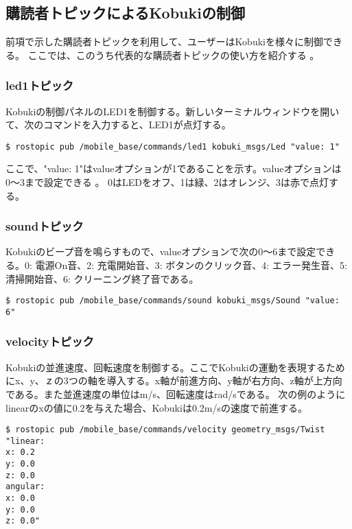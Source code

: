 \begin{itemize}
\subsection{購読者トピックによるKobukiの制御}

前項で示した購読者トピックを利用して、ユーザーはKobukiを様々に制御できる。  ここでは、このうち代表的な購読者トピックの使い方を紹介する  。

\subsubsection{led1トピック}

Kobukiの制御パネルのLED1を制御する。新しいターミナルウィンドウを開いて、次のコマンドを入力すると、LED1が点灯する。

\begin{lstlisting}[language=ROS]
$ rostopic pub /mobile_base/commands/led1 kobuki_msgs/Led "value: 1"
\end{lstlisting}

ここで、"value: 1"はvalueオプションが1であることを示す。valueオプションは0〜3まで設定できる  。 0はLEDをオフ、1は緑、2はオレンジ、3は赤で点灯する。

\subsubsection{soundトピック}

Kobukiのビープ音を鳴らすもので、valueオプションで次の0〜6まで設定できる。0: 電源On音、2: 充電開始音、3: ボタンのクリック音、4: エラー発生音、5: 清掃開始音、6: クリーニング終了音である。

\begin{lstlisting}[language=ROS]
$ rostopic pub /mobile_base/commands/sound kobuki_msgs/Sound "value: 6"
\end{lstlisting}

\subsubsection{velocityトピック}

Kobukiの並進速度、回転速度を制御する。ここでKobukiの運動を表現するためにx、y、ｚの3つの軸を導入する。x軸が前進方向、y軸が右方向、z軸が上方向である。また並進速度の単位はm/s、回転速度はrad/sである。
次の例のようにlinearのxの値に0.2を与えた場合、Kobukiは0.2m/sの速度で前進する。

\begin{lstlisting}[language=ROS]
$ rostopic pub /mobile_base/commands/velocity geometry_msgs/Twist "linear:
x: 0.2
y: 0.0
z: 0.0
angular:
x: 0.0
y: 0.0
z: 0.0"
\end{lstlisting}


\end{itemize}
